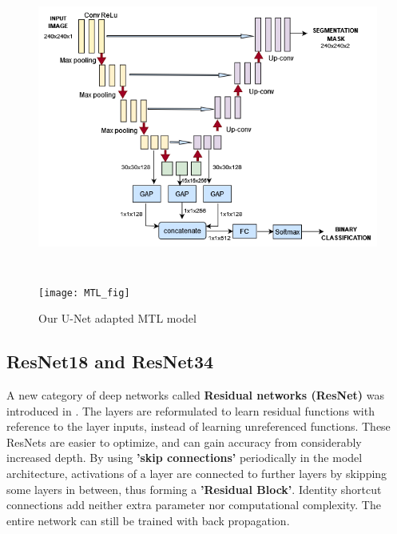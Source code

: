 \begin{figure}[H]
  \begin{center}
    \leavevmode
    \ifpdf
      \includegraphics[height=4in]{Experimental/Chapter2Figs/MTL.png}
    \else
      \texttt{[image: MTL\_fig]}
    \fi
    \caption{Our U-Net adapted MTL model}
    \label{MTL_fig}
  \end{center}
\end{figure}


\subsection{ResNet18 and ResNet34}
\vspace*{3mm}
A new category of deep networks called \textbf{Residual networks (ResNet)} was introduced in \cite{resnet}. The layers are reformulated to learn residual functions with reference to the layer inputs, instead of learning unreferenced functions. These ResNets are easier to optimize, and can gain accuracy from considerably increased depth. By using \textbf{'skip connections'} periodically in the model architecture,  activations of a layer are connected to further layers by skipping some layers in between, thus forming a \textbf{'Residual Block'}. Identity shortcut connections add neither extra parameter nor computational complexity. The entire network can still be trained with back propagation.


